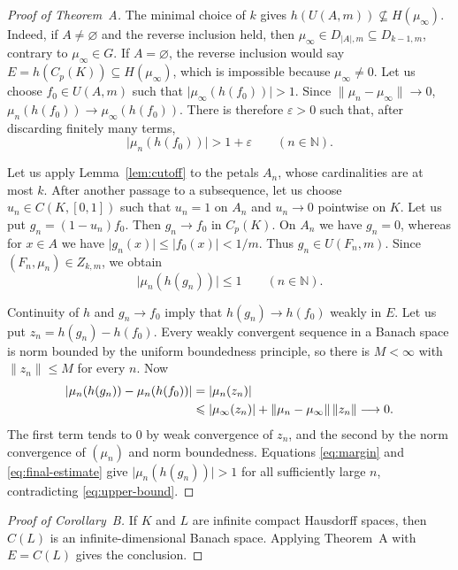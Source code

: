 \documentclass[a4paper]{amsart}
\newcommand{\N}{\mathbb{N}}
\newcommand{\abs}[1]{\lvert #1\rvert}
\newcommand{\norm}[1]{\lVert #1\rVert}
\begin{document}
\begin{proof}[Proof of Theorem~A]
The minimal choice of $k$ gives
$h(U(A,m))\nsubseteq H(\mu_\infty)$.
Indeed, if $A\ne\varnothing$ and the reverse inclusion held, then
$\mu_\infty\in D_{\abs A,m}\subseteq D_{k-1,m}$, contrary to
$\mu_\infty\in G$.  If $A=\varnothing$, the reverse inclusion would say
$E=h(C_p(K))\subseteq H(\mu_\infty)$, which is impossible because
$\mu_\infty\ne0$.  Let us choose $f_0\in U(A,m)$ such that
$\abs{\mu_\infty(h(f_0))}>1$.
Since $\norm{\mu_n-\mu_\infty}\to0$,
$\mu_n(h(f_0))\to\mu_\infty(h(f_0))$.  There is therefore
$\varepsilon>0$ such that, after discarding finitely many terms,
\begin{equation}\label{eq:margin}
                         \abs{\mu_n(h(f_0))}>1+\varepsilon
                         \qquad(n\in\N).
\end{equation}

Let us apply Lemma~\ref{lem:cutoff} to the petals $A_n$, whose cardinalities
are at most $k$.  After another passage to a subsequence, let us choose
$u_n\in C(K,[0,1])$ such that $u_n=1$ on $A_n$ and $u_n\to0$
pointwise on $K$.  Let us put $g_n=(1-u_n)f_0$.
Then $g_n\to f_0$ in $C_p(K)$.  On $A_n$ we have $g_n=0$, whereas for
$x\in A$ we have
$\abs{g_n(x)}\leqslant\abs{f_0(x)}<1/m$.  Thus $g_n\in U(F_n,m)$.
Since $(F_n,\mu_n)\in Z_{k,m}$, we obtain
\begin{equation}\label{eq:upper-bound}
                              \abs{\mu_n(h(g_n))}\leqslant1
                              \qquad(n\in\N).
\end{equation}

Continuity of $h$ and $g_n\to f_0$ imply that $h(g_n)\to h(f_0)$ weakly
in $E$.
Let us put $z_n=h(g_n)-h(f_0)$.  Every weakly convergent sequence in a Banach
space is norm bounded by the uniform boundedness principle, so there is
$M<\infty$ with $\norm{z_n}\leqslant M$ for every $n$.  Now
\begin{align}\label{eq:final-estimate}
 \abs{\mu_n(h(g_n))-\mu_n(h(f_0))}
 &=\abs{\mu_n(z_n)} \notag\\
 &\leqslant \abs{\mu_\infty(z_n)}
       +\norm{\mu_n-\mu_\infty}\,\norm{z_n}
   \longrightarrow0.
\end{align}
The first term tends to $0$ by weak convergence of $z_n$, and the second
by the norm convergence of $(\mu_n)$ and norm boundedness.  Equations
\eqref{eq:margin} and \eqref{eq:final-estimate} give
$\abs{\mu_n(h(g_n))}>1$ for all sufficiently large $n$, contradicting
\eqref{eq:upper-bound}.
\end{proof}

\begin{proof}[Proof of Corollary~B]
If $K$ and $L$ are infinite compact Hausdorff spaces, then $C(L)$ is an
infinite-dimensional Banach space.  Applying Theorem~A with $E=C(L)$
gives the conclusion.
\end{proof}
\end{document}
